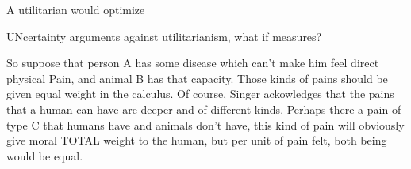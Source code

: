 \documentclass[12pt]{report}
\numberwithin{equation}{section}
\begin{document}
A utilitarian would optimize 

UNcertainty arguments against utilitarianism, what if measures? 








So suppose that person A has some disease which can't make him feel direct physical Pain, and animal B has that capacity. Those kinds of pains should be given equal weight in the calculus. Of course, Singer ackowledges that the pains that a human can have are deeper and of different kinds. Perhaps there a pain of type C that humans have and animals don't have, this kind of pain will obviously give moral TOTAL weight to the human, but per unit of pain felt, both being would be equal. 
\end{document}
